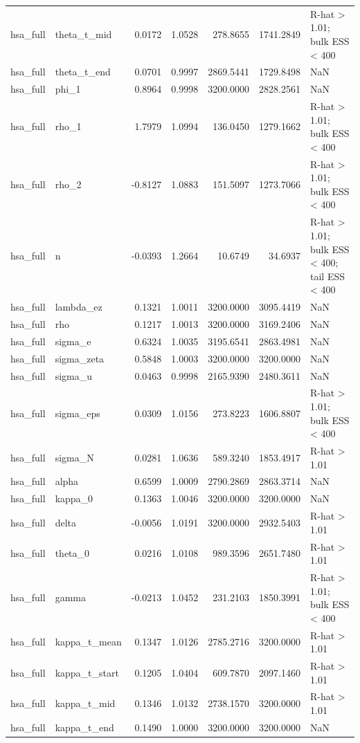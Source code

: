 \begin{tabular}{llrrrrl}
hsa\_full & theta\_t\_mid & 0.0172 & 1.0528 & 278.8655 & 1741.2849 & R-hat > 1.01; bulk ESS < 400 \\
hsa\_full & theta\_t\_end & 0.0701 & 0.9997 & 2869.5441 & 1729.8498 & NaN \\
hsa\_full & phi\_1 & 0.8964 & 0.9998 & 3200.0000 & 2828.2561 & NaN \\
hsa\_full & rho\_1 & 1.7979 & 1.0994 & 136.0450 & 1279.1662 & R-hat > 1.01; bulk ESS < 400 \\
hsa\_full & rho\_2 & -0.8127 & 1.0883 & 151.5097 & 1273.7066 & R-hat > 1.01; bulk ESS < 400 \\
hsa\_full & n & -0.0393 & 1.2664 & 10.6749 & 34.6937 & R-hat > 1.01; bulk ESS < 400; tail ESS < 400 \\
hsa\_full & lambda\_ez & 0.1321 & 1.0011 & 3200.0000 & 3095.4419 & NaN \\
hsa\_full & rho & 0.1217 & 1.0013 & 3200.0000 & 3169.2406 & NaN \\
hsa\_full & sigma\_e & 0.6324 & 1.0035 & 3195.6541 & 2863.4981 & NaN \\
hsa\_full & sigma\_zeta & 0.5848 & 1.0003 & 3200.0000 & 3200.0000 & NaN \\
hsa\_full & sigma\_u & 0.0463 & 0.9998 & 2165.9390 & 2480.3611 & NaN \\
hsa\_full & sigma\_eps & 0.0309 & 1.0156 & 273.8223 & 1606.8807 & R-hat > 1.01; bulk ESS < 400 \\
hsa\_full & sigma\_N & 0.0281 & 1.0636 & 589.3240 & 1853.4917 & R-hat > 1.01 \\
hsa\_full & alpha & 0.6599 & 1.0009 & 2790.2869 & 2863.3714 & NaN \\
hsa\_full & kappa\_0 & 0.1363 & 1.0046 & 3200.0000 & 3200.0000 & NaN \\
hsa\_full & delta & -0.0056 & 1.0191 & 3200.0000 & 2932.5403 & R-hat > 1.01 \\
hsa\_full & theta\_0 & 0.0216 & 1.0108 & 989.3596 & 2651.7480 & R-hat > 1.01 \\
hsa\_full & gamma & -0.0213 & 1.0452 & 231.2103 & 1850.3991 & R-hat > 1.01; bulk ESS < 400 \\
hsa\_full & kappa\_t\_mean & 0.1347 & 1.0126 & 2785.2716 & 3200.0000 & R-hat > 1.01 \\
hsa\_full & kappa\_t\_start & 0.1205 & 1.0404 & 609.7870 & 2097.1460 & R-hat > 1.01 \\
hsa\_full & kappa\_t\_mid & 0.1346 & 1.0132 & 2738.1570 & 3200.0000 & R-hat > 1.01 \\
hsa\_full & kappa\_t\_end & 0.1490 & 1.0000 & 3200.0000 & 3200.0000 & NaN \\

\end{tabular}

